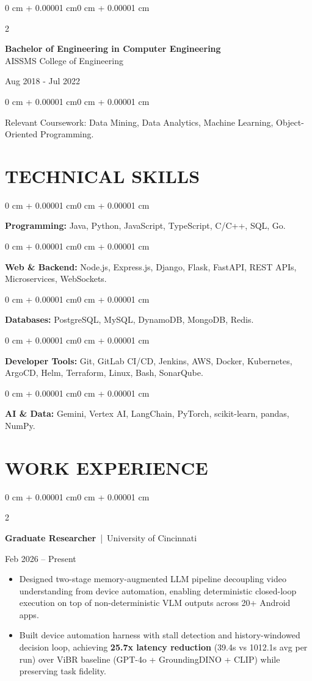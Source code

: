 \documentclass[10pt, letterpaper]{article}
\newenvironment{highlights}{
    \begin{itemize}[
        topsep=0.10 cm,
        parsep=0.06 cm,
        partopsep=0pt,
        itemsep=0.06 cm,
        leftmargin=12pt
    ]
}{
    \end{itemize}
}
\newenvironment{onecolentry}{
    \begin{adjustwidth}{0 cm + 0.00001 cm}{0 cm + 0.00001 cm}
}{
    \end{adjustwidth}
}
\newenvironment{twocolentry}[2][]{
    \onecolentry
    \def\secondColumn{#2}
    \setcolumnwidth{\fill, 4.5 cm}
    \begin{paracol}{2}
}{
    \switchcolumn \raggedleft \secondColumn
    \end{paracol}
    \endonecolentry
}
\begin{document}
\begin{twocolentry}{
    Aug 2018 - Jul 2022
}
    \textbf{Bachelor of Engineering in Computer Engineering} \\
    AISSMS College of Engineering
\end{twocolentry}
\begin{onecolentry}
Relevant Coursework: Data Mining, Data Analytics, Machine Learning, Object-Oriented Programming.
\end{onecolentry}
\section{TECHNICAL SKILLS}
\begin{onecolentry}
\textbf{Programming:} Java, Python, JavaScript, TypeScript, C/C++, SQL, Go.
\end{onecolentry}
\vspace{0.06 cm}
\begin{onecolentry}
\textbf{Web \& Backend:} Node.js, Express.js, Django, Flask, FastAPI, REST APIs, Microservices, WebSockets.
\end{onecolentry}
\vspace{0.06 cm}
\begin{onecolentry}
\textbf{Databases:} PostgreSQL, MySQL, DynamoDB, MongoDB, Redis.
\end{onecolentry}
\vspace{0.06 cm}
\begin{onecolentry}
\textbf{Developer Tools:} Git, GitLab CI/CD, Jenkins, AWS, Docker, Kubernetes, ArgoCD, Helm, Terraform, Linux, Bash, SonarQube.
\end{onecolentry}
\vspace{0.06 cm}
\begin{onecolentry}
\textbf{AI \& Data:} Gemini, Vertex AI, LangChain, PyTorch, scikit-learn, pandas, NumPy.
\end{onecolentry}

\section{WORK EXPERIENCE}
\begin{twocolentry}{Feb 2026 -- Present}
\textbf{Graduate Researcher} \,|\, University of Cincinnati
\end{twocolentry}
\begin{highlights}
  \item Designed two-stage memory-augmented LLM pipeline decoupling video understanding from device automation, enabling deterministic closed-loop execution on top of non-deterministic VLM outputs across 20+ Android apps.
  \item Built device automation harness with stall detection and history-windowed decision loop, achieving \textbf{25.7x latency reduction} (39.4s vs 1012.1s avg per run) over ViBR baseline (GPT-4o + GroundingDINO + CLIP) while preserving task fidelity.
\end{highlights}
\end{document}
